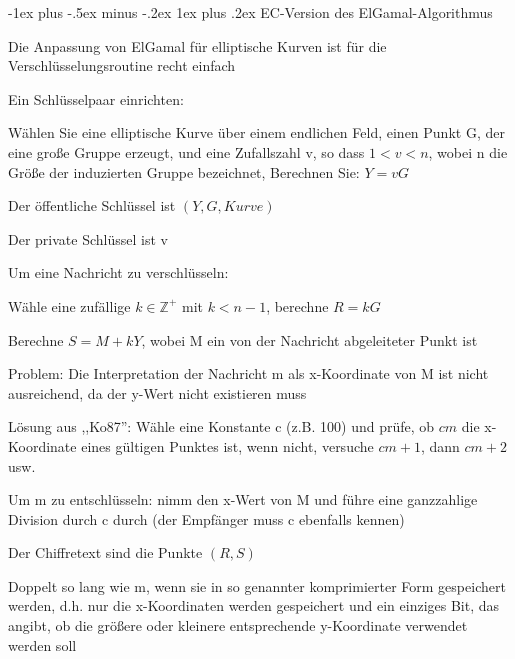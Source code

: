 \documentclass[a4paper]{article}
\makeatletter
\renewcommand{\subsubsection}{\@startsection{subsubsection}{3}{0mm}%
 {-1ex plus -.5ex minus -.2ex}%
 {1ex plus .2ex}%
 {\normalfont\small\bfseries}}
\makeatother
\begin{document}
\begin{multicols}{3}
      \subsubsection{EC-Version des ElGamal-Algorithmus}
      \begin{itemize*}
            \item Die Anpassung von ElGamal für elliptische Kurven ist für die Verschlüsselungsroutine recht einfach
            \item Ein Schlüsselpaar einrichten:
            \begin{itemize*}
                  \item Wählen Sie eine elliptische Kurve über einem endlichen Feld, einen Punkt G, der eine große Gruppe erzeugt, und eine Zufallszahl v, so dass $1 < v < n$, wobei n die Größe der induzierten Gruppe bezeichnet, Berechnen Sie: $Y = vG$
                  \item Der öffentliche Schlüssel ist $(Y,G,Kurve)$
                  \item Der private Schlüssel ist v
            \end{itemize*}
            \item Um eine Nachricht zu verschlüsseln:
            \begin{itemize*}
                  \item Wähle eine zufällige $k\in\mathbb{Z}^+$ mit $k< n-1$, berechne $R=kG$
                  \item Berechne $S=M+kY$, wobei M ein von der Nachricht abgeleiteter Punkt ist
                  \begin{itemize*}
                        \item Problem: Die Interpretation der Nachricht m als x-Koordinate von M ist nicht ausreichend, da der y-Wert nicht existieren muss
                        \item Lösung aus ,,Ko87'': Wähle eine Konstante c (z.B. 100) und prüfe, ob $cm$ die x-Koordinate eines gültigen Punktes ist, wenn nicht, versuche $cm+1$, dann $cm+2$ usw.
                        \item Um m zu entschlüsseln: nimm den x-Wert von M und führe eine ganzzahlige Division durch c durch (der Empfänger muss c ebenfalls kennen)
                  \end{itemize*}
                  \item Der Chiffretext sind die Punkte $(R,S)$
                  \item Doppelt so lang wie m, wenn sie in so genannter komprimierter Form gespeichert werden, d.h. nur die x-Koordinaten werden gespeichert und ein einziges Bit, das angibt, ob die größere oder kleinere entsprechende y-Koordinate verwendet werden soll

\end{itemize*}
\end{itemize*}
\end{multicols}
\end{document}
